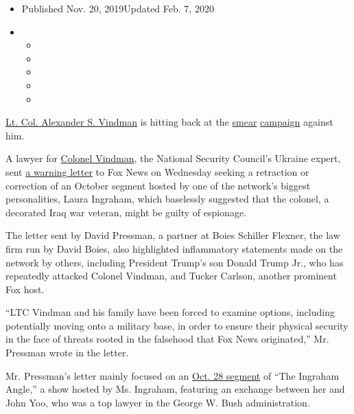 \begin{itemize}
\item
  Published Nov. 20, 2019Updated Feb. 7, 2020
\item
  \begin{itemize}
  \item
  \item
  \item
  \item
  \item
  \end{itemize}
\end{itemize}

\href{https://www.nytimes.com/2020/02/07/us/politics/alexander-vindman-white-house.html}{Lt.
Col. Alexander S. Vindman} is hitting back at the
\href{https://www.nytimes.com/2019/10/29/business/media/fox-news-alexander-vindman.html}{smear}
\href{https://www.nytimes.com/2019/11/06/us/politics/trump-vindman-twitter.html}{campaign}
against him.

A lawyer for
\href{https://www.nytimes.com/2020/07/08/us/politics/vindman-trump-ukraine-impeachment.html}{Colonel
Vindman}, the National Security Council's Ukraine expert, sent
\href{https://www.documentcloud.org/documents/6555531-VIndman-Boies-LETTER.html}{a
warning letter} to Fox News on Wednesday seeking a retraction or
correction of an October segment hosted by one of the network's biggest
personalities, Laura Ingraham, which baselessly suggested that the
colonel, a decorated Iraq war veteran, might be guilty of espionage.

The letter sent by David Pressman, a partner at Boies Schiller Flexner,
the law firm run by David Boies, also highlighted inflammatory
statements made on the network by others, including President Trump's
son Donald Trump Jr., who has repeatedly attacked Colonel Vindman, and
Tucker Carlson, another prominent Fox host.

``LTC Vindman and his family have been forced to examine options,
including potentially moving onto a military base, in order to ensure
their physical security in the face of threats rooted in the falsehood
that Fox News originated,'' Mr. Pressman wrote in the letter.

Mr. Pressman's letter mainly focused on an
\href{https://www.mediamatters.org/trump-impeachment-inquiry/laura-ingraham-guest-suggests-congressional-witness-lt-col-vindman-may-be}{Oct.
28 segment} of ``The Ingraham Angle,'' a show hosted by Ms. Ingraham,
featuring an exchange between her and John Yoo, who was a top lawyer in
the George W. Bush administration.


